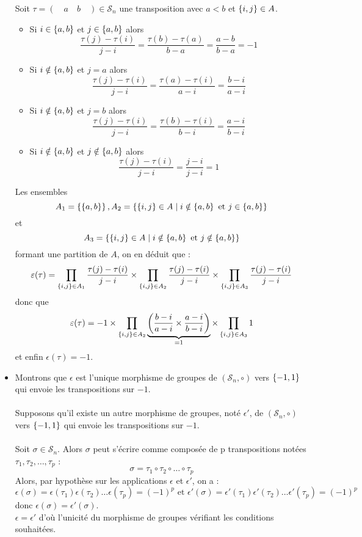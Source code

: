 \begin{dem}
\begin{itemize}
        Soit \(\tau = ( \quad a \quad b\quad ) \in  \mathcal{S}_n\) une transposition avec \(a < b\) et \(\left\lbrace i, j\right\rbrace \in  A\).
        \begin{itemize}
            \item Si \(i \in  \left\lbrace a,b\right\rbrace\) et \(j \in  \left\lbrace a,b\right\rbrace\) alors
                \[\frac{\tau (j) - \tau (i)}{j - i} = \frac{\tau (b) - \tau (a)}{b - a} = \frac{a - b}{b - a} = -1\]
            \item Si \(i \notin  \left\lbrace a,b\right\rbrace\) et \(j = a\) alors
                \[\frac{\tau (j) - \tau (i)}{j - i }= \frac{\tau (a) - \tau (i)}{a - i} = \frac{b - i }{a - i} \]
            \item Si \(i \notin  \left\lbrace a,b\right\rbrace\) et \(j = b\) alors
                \[\frac{\tau (j) - \tau (i)}{j - i} = \frac{\tau (b) - \tau (i)}{b - i} = \frac{a - i}{b - i}\]
            \item Si \(i \notin  \left\lbrace a,b\right\rbrace\) et \(j \notin  \left\lbrace a,b\right\rbrace\) alors
                \[\frac{\tau (j) - \tau (i)}{j - i} = \frac{j - i}{j - i} = 1\]
        \end{itemize}
        Les ensembles
        \[A_1 = \left\lbrace\left\lbrace a,b\right\rbrace\right\rbrace , A_2 = \left\lbrace\left\lbrace i, j\right\rbrace \in  A \;\middle|\; i \notin  \left\lbrace a,b\right\rbrace \text{ et } j \in  \left\lbrace a,b\right\rbrace\right\rbrace\]
        et
        \[A_3 = \left\lbrace\left\lbrace i, j\right\rbrace \in  A \;\middle|\; i \notin  \left\lbrace a,b\right\rbrace \text{ et }j \notin  \left\lbrace a,b\right\rbrace\right\rbrace\]
        formant une partition de \(A\), on en déduit que :
        \[\varepsilon (\tau ) = \prod_{\left\lbrace i,j\right\rbrace\in A_1} \frac{\tau (j) - \tau (i)}{j - i} \times \prod_{\left\lbrace i,j\right\rbrace\in A_2} \frac{\tau (j) - \tau (i)}{j - i} \times \prod_{\left\lbrace i,j\right\rbrace\in A_3}\frac{\tau (j) - \tau (i)}{j - i}\]
        donc que
        \[\varepsilon (\tau ) = -1 \times \prod_{\left\lbrace i,j\right\rbrace\in A_2}\underbrace{\left(\frac{ b - i}{a - i} \times \frac{ a - i}{b - i}\right)}_{=1} \times \prod_{\left\lbrace i,j\right\rbrace\in A_3} 1 \]
        et enfin \(\epsilon (\tau ) = -1\).
    \item Montrons que \(\epsilon\)  est l’unique morphisme de groupes de \((\mathcal{S}_n, \circ)\) vers \(\left\lbrace-1, 1\right\rbrace\) qui envoie les transpositions sur \(-1\).\\~\\
        Supposons qu’il existe un autre morphisme de groupes, noté \(\epsilon '\), de \((\mathcal{S}_n, \circ)\) vers \(\left\lbrace-1, 1\right\rbrace\) qui envoie les transpositions sur \(-1\).\\~\\
        Soit \(\sigma  \in  \mathcal{S}_n\). Alors \(\sigma\)  peut s’écrire comme composée de p transpositions notées \(\tau_1, \tau_2, \dots , \tau_p\) :
        \[\sigma  = \tau_1 \circ \tau_2 \circ \dots \circ \tau_p\]
        Alors, par hypothèse sur les applications \(\epsilon\)  et \(\epsilon '\), on a :
        \[\epsilon (\sigma ) = \epsilon  (\tau_1) \epsilon  (\tau_2) \dots \epsilon  (\tau_p) = (-1)^{p} \text{ et }\epsilon '(\sigma ) = \epsilon ' (\tau_1) \epsilon ' (\tau_2) \dots \epsilon ' (\tau_p) = (-1)^p\]
        donc \(\epsilon (\sigma ) = \epsilon ' (\sigma )\).\\
        \conclusion \(\epsilon  = \epsilon '\) d’où l’unicité du morphisme de groupes vérifiant les conditions souhaitées.
    \end{itemize}
\end{dem}
